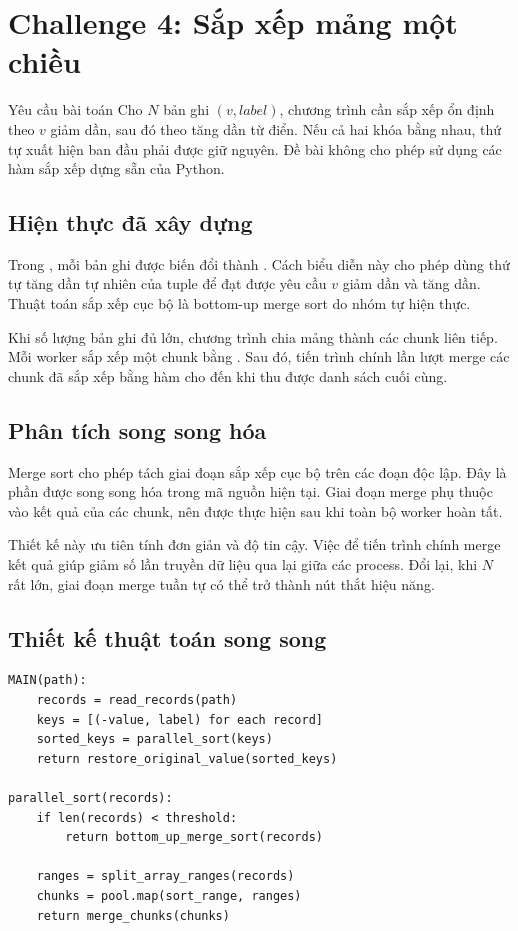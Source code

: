 \section{Challenge 4: Sắp xếp mảng một chiều}
\label{sec:challenge4}

\begin{requirementbox}{Yêu cầu bài toán}
Cho $N$ bản ghi $(v, label)$, chương trình cần sắp xếp ổn định theo $v$ giảm dần, sau đó theo  tăng dần từ điển. Nếu cả hai khóa bằng nhau, thứ tự xuất hiện ban đầu phải được giữ nguyên. Đề bài không cho phép sử dụng các hàm sắp xếp dựng sẵn của Python.
\end{requirementbox}

\subsection{Hiện thực đã xây dựng}
Trong , mỗi bản ghi được biến đổi thành . Cách biểu diễn này cho phép dùng thứ tự tăng dần tự nhiên của tuple để đạt được yêu cầu $v$ giảm dần và  tăng dần. Thuật toán sắp xếp cục bộ là bottom-up merge sort do nhóm tự hiện thực.

Khi số lượng bản ghi đủ lớn, chương trình chia mảng thành các chunk liên tiếp. Mỗi worker sắp xếp một chunk bằng . Sau đó, tiến trình chính lần lượt merge các chunk đã sắp xếp bằng hàm  cho đến khi thu được danh sách cuối cùng.

\subsection{Phân tích song song hóa}
Merge sort cho phép tách giai đoạn sắp xếp cục bộ trên các đoạn độc lập. Đây là phần được song song hóa trong mã nguồn hiện tại. Giai đoạn merge phụ thuộc vào kết quả của các chunk, nên được thực hiện sau khi toàn bộ worker hoàn tất.

Thiết kế này ưu tiên tính đơn giản và độ tin cậy. Việc để tiến trình chính merge kết quả giúp giảm số lần truyền dữ liệu qua lại giữa các process. Đổi lại, khi $N$ rất lớn, giai đoạn merge tuần tự có thể trở thành nút thắt hiệu năng.

\subsection{Thiết kế thuật toán song song}
\begin{lstlisting}[caption={Pseudocode song song cho Challenge 4}]
MAIN(path):
    records = read_records(path)
    keys = [(-value, label) for each record]
    sorted_keys = parallel_sort(keys)
    return restore_original_value(sorted_keys)

parallel_sort(records):
    if len(records) < threshold:
        return bottom_up_merge_sort(records)

    ranges = split_array_ranges(records)
    chunks = pool.map(sort_range, ranges)
    return merge_chunks(chunks)
\end{lstlisting}

